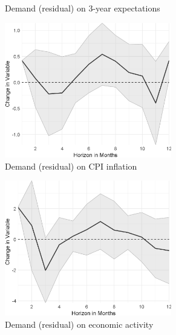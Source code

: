 \begin{figure}
\begin{subfigure}{00.24\textwidth}
		\caption{Demand (residual) on 3-year expectations}
	\end{subfigure}
	\begin{subfigure}{00.24\textwidth}
		\includegraphics[width=0.8\textwidth]{output/lp/baseline/bHP/demand/demandoninflation_djn.eps}
		\caption{Demand (residual) on CPI inflation}
	\end{subfigure}
	\begin{subfigure}{00.24\textwidth}
		\includegraphics[width=0.8\textwidth]{output/lp/baseline/bHP/demand/demandoneconac_djn.eps}
		\caption{Demand (residual) on economic activity}
	\end{subfigure}
	\begin{subfigure}{00.24\textwidth}

\end{subfigure}
\end{figure}

